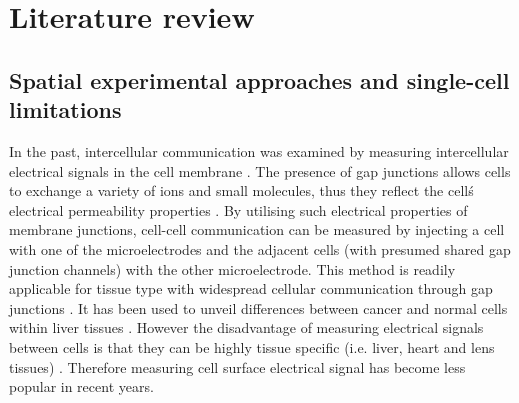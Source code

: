 \section{Literature review}

\subsection{Spatial experimental approaches and single-cell limitations}
In the past, intercellular communication was examined by measuring intercellular electrical signals in the cell membrane \cite{bennett1966physiology, loewenstein1967intercellular, de1982cell}. The presence of gap junctions allows cells to exchange a variety of ions and small molecules, thus they reflect the cell\'s electrical permeability properties \cite{penn1966ionic, bennett1966physiology,loewenstein1966permeability,loewenstein1974cellular}. By utilising such electrical properties of membrane junctions, cell-cell communication can be measured by injecting a cell with one of the microelectrodes and the adjacent cells (with presumed shared gap junction channels) with the other microelectrode. This method is readily applicable for tissue type with widespread cellular communication through gap junctions \cite{penn1966ionic}. It has been used to unveil differences between cancer and normal cells within liver tissues \cite{loewenstein1966intercellular, loewenstein1967intercellular}. However the disadvantage of measuring electrical signals between cells is that they can be highly tissue specific (i.e. liver, heart and lens tissues) \cite{gros1983comparative}. Therefore measuring cell surface electrical signal has become less popular in recent years. 

